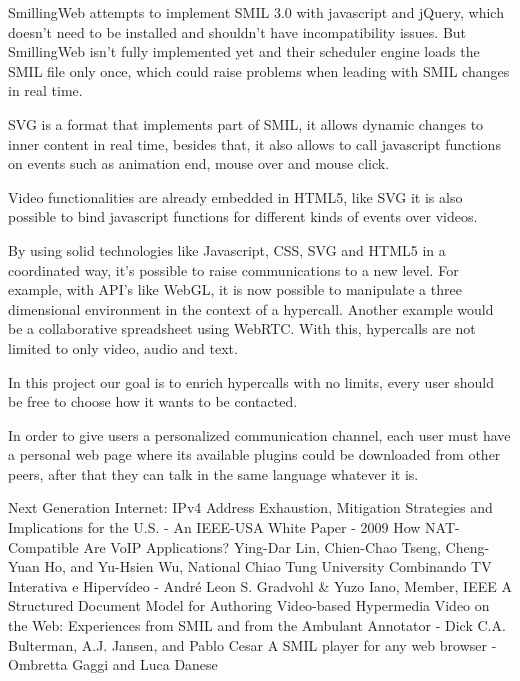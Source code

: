\documentclass[11pt,twocolumn]{article}
\begin{document}
  SmillingWeb \cite{smillingweb} attempts to implement SMIL 3.0 with javascript and jQuery, which doesn't need to be installed and shouldn't have incompatibility issues. But SmillingWeb isn't fully implemented yet and their scheduler engine loads the SMIL file only once, which could raise problems when leading with SMIL changes in real time.  

  SVG is a format that implements part of SMIL, it allows dynamic changes to inner content in real time, besides that, it also allows to call javascript functions on events such as animation end, mouse over and mouse click.

  Video functionalities are already embedded in HTML5, like SVG it is also possible to bind javascript functions for different kinds of events over videos.

  By using solid technologies like Javascript, CSS, SVG and HTML5 in a coordinated way, it's possible to raise communications to a new level. For example, with API's like WebGL, it is now possible to manipulate a three dimensional environment in the context of a hypercall. Another example would be a collaborative spreadsheet using WebRTC. With this, hypercalls are not limited to only video, audio and text.

  In this project our goal is to enrich hypercalls with no limits, every user should be free to choose how it wants to be contacted.

  In order to give users a personalized communication channel, each user must have a personal web page where its available plugins could be downloaded from other peers, after that they can talk in the same language whatever it is.




\begin{thebibliography}{9}


 Next Generation Internet: IPv4 Address Exhaustion, Mitigation Strategies and Implications for the U.S. - An IEEE-USA White Paper - 2009
 How NAT-Compatible Are VoIP Applications? Ying-Dar Lin, Chien-Chao Tseng, Cheng-Yuan Ho, and Yu-Hsien Wu, National Chiao Tung University
 Combinando TV Interativa e Hipervídeo - André Leon S. Gradvohl \& Yuzo Iano, Member, IEEE
 A Structured Document Model for Authoring Video-based Hypermedia
 Video on the Web: Experiences from SMIL and from the Ambulant Annotator - Dick C.A. Bulterman, A.J. Jansen, and Pablo Cesar
 A SMIL player for any web browser - Ombretta Gaggi and Luca Danese

\end{thebibliography}
\end{document}
